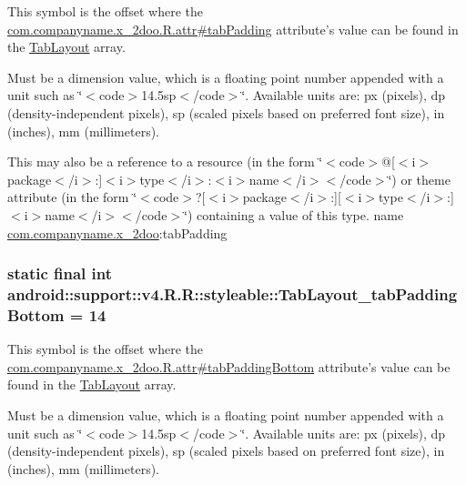 This symbol is the offset where the \hyperlink{classcom_1_1companyname_1_1x__2doo_1_1_r_1_1attr_3be2300742e7efece7c3b28538170728}{com.companyname.x\_\-2doo.R.attr\#tabPadding} attribute's value can be found in the \hyperlink{classandroid_1_1support_1_1v4_1_1_r_1_1styleable_d1f1104cdc4fac0ab4797d48f7efe351}{TabLayout} array.

Must be a dimension value, which is a floating point number appended with a unit such as \char`\"{}$<$code$>$14.5sp$<$/code$>$\char`\"{}. Available units are: px (pixels), dp (density-independent pixels), sp (scaled pixels based on preferred font size), in (inches), mm (millimeters). 

This may also be a reference to a resource (in the form \char`\"{}$<$code$>$@\mbox{[}$<$i$>$package$<$/i$>$:\mbox{]}$<$i$>$type$<$/i$>$:$<$i$>$name$<$/i$>$$<$/code$>$\char`\"{}) or theme attribute (in the form \char`\"{}$<$code$>$?\mbox{[}$<$i$>$package$<$/i$>$:\mbox{]}\mbox{[}$<$i$>$type$<$/i$>$:\mbox{]}$<$i$>$name$<$/i$>$$<$/code$>$\char`\"{}) containing a value of this type.  name \hyperlink{namespacecom_1_1companyname_1_1x__2doo}{com.companyname.x\_\-2doo}:tabPadding \hypertarget{classandroid_1_1support_1_1v4_1_1_r_1_1styleable_52f17fc2c908e7fc2d72f48472b4125e}{
\subsubsection[{TabLayout\_\-tabPaddingBottom}]{\setlength{\rightskip}{0pt plus 5cm}static final int android::support::v4.R.R::styleable::TabLayout\_\-tabPaddingBottom = 14}}
\label{classandroid_1_1support_1_1v4_1_1_r_1_1styleable_52f17fc2c908e7fc2d72f48472b4125e}


This symbol is the offset where the \hyperlink{classcom_1_1companyname_1_1x__2doo_1_1_r_1_1attr_600d6830eb7b29b2cd3f72d047542b55}{com.companyname.x\_\-2doo.R.attr\#tabPaddingBottom} attribute's value can be found in the \hyperlink{classandroid_1_1support_1_1v4_1_1_r_1_1styleable_d1f1104cdc4fac0ab4797d48f7efe351}{TabLayout} array.

Must be a dimension value, which is a floating point number appended with a unit such as \char`\"{}$<$code$>$14.5sp$<$/code$>$\char`\"{}. Available units are: px (pixels), dp (density-independent pixels), sp (scaled pixels based on preferred font size), in (inches), mm (millimeters). 

